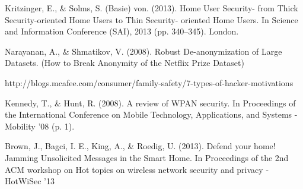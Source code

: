 \documentclass[10pt,journal,compsoc]{IEEEtran}
\begin{document}
\begin{thebibliography}{1}
Kritzinger, E., \& Solms, S. (Basie) von. (2013). Home User Security- from Thick Security-oriented Home Users to Thin Security- oriented Home Users. In Science and Information Conference (SAI), 2013 (pp. 340–345). London.

Narayanan, A., \& Shmatikov, V. (2008). Robust De-anonymization of Large Datasets. (How to Break Anonymity of the Netflix Prize Dataset)

http://blogs.mcafee.com/consumer/family-safety/7-types-of-hacker-motivations

Kennedy, T., \& Hunt, R. (2008). A review of WPAN security. In Proceedings of the International Conference on Mobile Technology, Applications, and Systems - Mobility ’08 (p. 1).

Brown, J., Bagci, I. E., King, A., \& Roedig, U. (2013). Defend your home! Jamming Unsolicited Messages in the Smart Home. In Proceedings of the 2nd ACM workshop on Hot topics on wireless network security and privacy - HotWiSec ’13 
\end{thebibliography}



\end{document}
